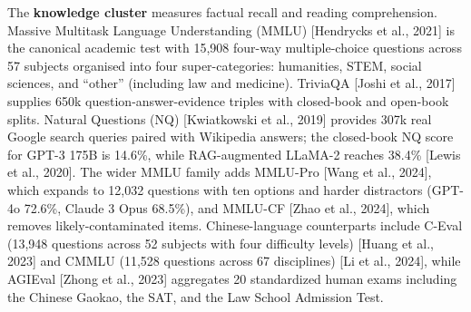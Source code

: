 The \textbf{knowledge cluster} measures factual recall and reading comprehension. Massive Multitask Language Understanding (MMLU) {[}Hendrycks et al., 2021{]} is the canonical academic test with 15,908 four-way multiple-choice questions across 57 subjects organised into four super-categories: humanities, STEM, social sciences, and ``other'' (including law and medicine). TriviaQA {[}Joshi et al., 2017{]} supplies 650k question-answer-evidence triples with closed-book and open-book splits. Natural Questions (NQ) {[}Kwiatkowski et al., 2019{]} provides 307k real Google search queries paired with Wikipedia answers; the closed-book NQ score for GPT-3 175B is 14.6\%, while RAG-augmented LLaMA-2 reaches 38.4\% {[}Lewis et al., 2020{]}. The wider MMLU family adds MMLU-Pro {[}Wang et al., 2024{]}, which expands to 12,032 questions with ten options and harder distractors (GPT-4o 72.6\%, Claude 3 Opus 68.5\%), and MMLU-CF {[}Zhao et al., 2024{]}, which removes likely-contaminated items. Chinese-language counterparts include C-Eval (13,948 questions across 52 subjects with four difficulty levels) {[}Huang et al., 2023{]} and CMMLU (11,528 questions across 67 disciplines) {[}Li et al., 2024{]}, while AGIEval {[}Zhong et al., 2023{]} aggregates 20 standardized human exams including the Chinese Gaokao, the SAT, and the Law School Admission Test.

